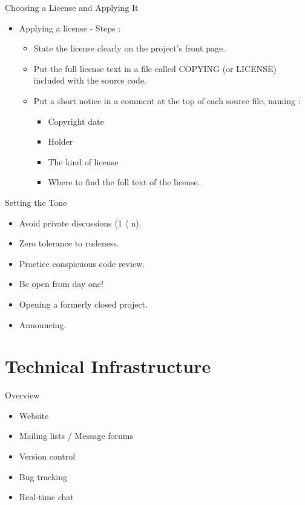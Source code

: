 \documentclass{beamer}
\begin{document}
\begin{frame}{Choosing a License and Applying It} \pause
\begin{itemize}
	\item Applying a license - Steps : \pause
	\begin{itemize}
		\item State the license clearly on the project's front page. \pause
		\item Put the full license text in a file called COPYING (or LICENSE) included with the source code. \pause
		\item Put a short notice in a comment at the top of each source file, naming :
		\begin{itemize}
			\item Copyright date
			\item Holder
			\item The kind of license
			\item Where to find the full text of the license. 
		\end{itemize}
	\end{itemize}
\end{itemize}
\end{frame}

\begin{frame}{Setting the Tone}
\begin{itemize}
	\item Avoid private discussions (1 $\langle$ n).\pause
	\item Zero tolerance to rudeness. \pause
	\item Practice conspicuous code review. \pause
	\item Be open from day one! \pause
	\item Opening a formerly closed project. \pause
	\item Announcing. \pause
\end{itemize}
\end{frame}

\section{Technical Infrastructure}
\begin{frame}{Overview}
\begin{itemize}
	\item Website
	\item Mailing lists / Message forums
	\item Version control
	\item Bug tracking
	\item Real-time chat
\end{itemize}
\end{frame}
\end{document}
